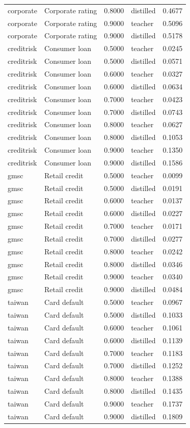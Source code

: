 \begin{tabular}{llrlr}
corporate & Corporate rating & 0.8000 & distilled & 0.4677 \\
corporate & Corporate rating & 0.9000 & teacher & 0.5096 \\
corporate & Corporate rating & 0.9000 & distilled & 0.5178 \\
creditrisk & Consumer loan & 0.5000 & teacher & 0.0245 \\
creditrisk & Consumer loan & 0.5000 & distilled & 0.0571 \\
creditrisk & Consumer loan & 0.6000 & teacher & 0.0327 \\
creditrisk & Consumer loan & 0.6000 & distilled & 0.0634 \\
creditrisk & Consumer loan & 0.7000 & teacher & 0.0423 \\
creditrisk & Consumer loan & 0.7000 & distilled & 0.0743 \\
creditrisk & Consumer loan & 0.8000 & teacher & 0.0627 \\
creditrisk & Consumer loan & 0.8000 & distilled & 0.1053 \\
creditrisk & Consumer loan & 0.9000 & teacher & 0.1350 \\
creditrisk & Consumer loan & 0.9000 & distilled & 0.1586 \\
gmsc & Retail credit & 0.5000 & teacher & 0.0099 \\
gmsc & Retail credit & 0.5000 & distilled & 0.0191 \\
gmsc & Retail credit & 0.6000 & teacher & 0.0137 \\
gmsc & Retail credit & 0.6000 & distilled & 0.0227 \\
gmsc & Retail credit & 0.7000 & teacher & 0.0171 \\
gmsc & Retail credit & 0.7000 & distilled & 0.0277 \\
gmsc & Retail credit & 0.8000 & teacher & 0.0242 \\
gmsc & Retail credit & 0.8000 & distilled & 0.0346 \\
gmsc & Retail credit & 0.9000 & teacher & 0.0340 \\
gmsc & Retail credit & 0.9000 & distilled & 0.0484 \\
taiwan & Card default & 0.5000 & teacher & 0.0967 \\
taiwan & Card default & 0.5000 & distilled & 0.1033 \\
taiwan & Card default & 0.6000 & teacher & 0.1061 \\
taiwan & Card default & 0.6000 & distilled & 0.1139 \\
taiwan & Card default & 0.7000 & teacher & 0.1183 \\
taiwan & Card default & 0.7000 & distilled & 0.1252 \\
taiwan & Card default & 0.8000 & teacher & 0.1388 \\
taiwan & Card default & 0.8000 & distilled & 0.1435 \\
taiwan & Card default & 0.9000 & teacher & 0.1737 \\
taiwan & Card default & 0.9000 & distilled & 0.1809 \\
\bottomrule
\end{tabular}
